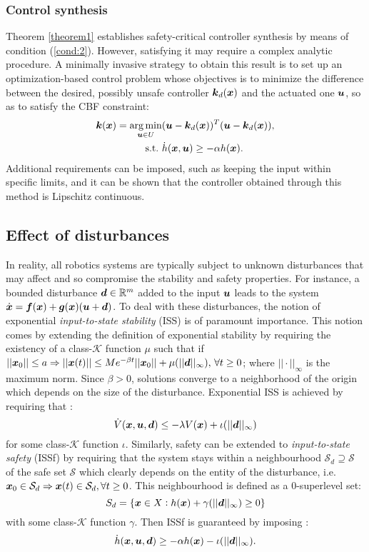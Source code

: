 \subsubsection{Control synthesis}
Theorem \ref{theorem1} establishes safety-critical controller 
synthesis by means of condition (\ref{cond:2}). However, satisfying  it may require a complex analytic procedure. A minimally invasive strategy to obtain this result is to set up an optimization-based control problem whose objectives is to minimize the difference between the desired, possibly unsafe controller $\boldsymbol{k}_d(\boldsymbol{x})$ and the actuated one $\boldsymbol{u}$, so as to satisfy the CBF constraint:
\begin{equation}
\begin{aligned}
\boldsymbol{k}(\boldsymbol{x})=\underset{\boldsymbol{u}\in U}{\arg\min}  &(\boldsymbol{u}-\boldsymbol{k}_d(\boldsymbol{x}))^T(\boldsymbol{u}-\boldsymbol{k}_d(\boldsymbol{x})), \\ 
\mathrm{s.t.}\,\, &\dot{h}(\boldsymbol{x},\boldsymbol{u})\geq -\alpha h(\boldsymbol{x}).
\end{aligned}
\end{equation}
Additional requirements can be imposed, such as keeping the input within specific limits, and it can be shown that the controller obtained through this method is Lipschitz continuous.
\subsection{Effect of disturbances}
In reality, all robotics systems are typically subject to unknown disturbances that may affect and so compromise the stability and safety properties. For instance, a bounded disturbance $\boldsymbol{d}\in\mathbb{R}^m$ added to the input $\boldsymbol{u}$ leads to the system $\dot{\boldsymbol{x}} = \boldsymbol{f}(\boldsymbol{x})+\boldsymbol{g}(\boldsymbol{x})(\boldsymbol{u}+\boldsymbol{d})$. To deal with these disturbances, the notion of exponential \textit{input-to-state stability} (ISS) is of paramount importance. This notion comes by extending the definition of exponential stability by requiring the existency of a class-$\mathcal{K}$ function $\mu$ such that if $||\boldsymbol{x}_0||  \leq a \Rightarrow  ||\boldsymbol{x}(t)||\leq Me^{-\beta t}||\boldsymbol{x}_0||+ \mu(||\boldsymbol{d}||_\infty ),\, \forall t \geq 0$; where $||\cdot||_\infty$  is the maximum norm.
Since $\beta>0$, solutions converge to a neighborhood of the origin which depends on the size of the disturbance. Exponential ISS is achieved by requiring that : 
\begin{equation} 
\dot{V}(\boldsymbol{x},\boldsymbol{u},\boldsymbol{d}) \leq -\lambda V(\boldsymbol{x})+\iota( ||\boldsymbol{d}||_\infty)
\end{equation} for some class-$\mathcal{K}$ function $\iota$. Similarly, safety can be extended to \textit{input-to-state safety} (ISSf) by requiring that the system stays within a neighbourhood $\mathcal{S}_d \supseteq  \mathcal{S}$ of the safe set $\mathcal{S}$ which clearly depends on the entity of the disturbance, i.e. $\boldsymbol{x}_0 \in \mathcal{S}_d \Rightarrow \boldsymbol{x}(t) \in \mathcal{S}_d, \forall t\geq 0$. This neighbourhood is defined as a 0-superlevel set: 
\begin{equation}
    S_d = \{\boldsymbol{x} \in X: h(\boldsymbol{x}) + \gamma(||\boldsymbol{d}||_\infty)\geq 0\}
\end{equation}
with some class-$\mathcal{K}$ function $\gamma$. Then ISSf is guaranteed by imposing : 
\begin{equation}
    \dot{h}(\boldsymbol{x},\boldsymbol{u},\boldsymbol{d})\geq -\alpha h(\boldsymbol{x}) - \iota(||\boldsymbol{d}||_\infty).
\end{equation}